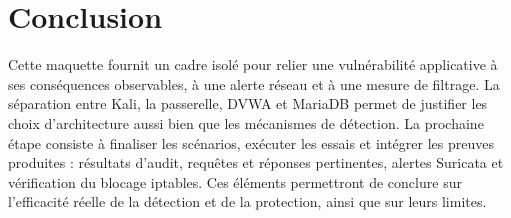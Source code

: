 \section{Conclusion}\label{sec:conclusion}

Cette maquette fournit un cadre isolé pour relier une vulnérabilité applicative à ses conséquences observables, à une alerte réseau et à une mesure de filtrage.
La séparation entre Kali, la passerelle, DVWA et MariaDB permet de justifier les choix d'architecture aussi bien que les mécanismes de détection.
La prochaine étape consiste à finaliser les scénarios, exécuter les essais et intégrer les preuves produites : résultats d'audit, requêtes et réponses pertinentes, alertes Suricata et vérification du blocage iptables.
Ces éléments permettront de conclure sur l'efficacité réelle de la détection et de la protection, ainsi que sur leurs limites.
